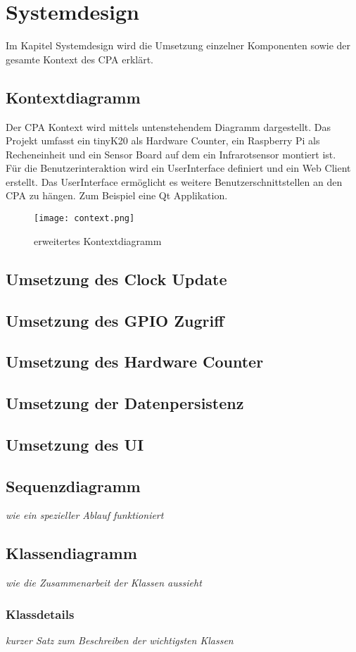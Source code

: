\section{Systemdesign}
    Im Kapitel Systemdesign wird die Umsetzung einzelner Komponenten sowie der gesamte Kontext des CPA erklärt.
        \subsection{Kontextdiagramm}
        Der CPA Kontext wird mittels untenstehendem Diagramm dargestellt. Das Projekt umfasst ein tinyK20 als Hardware Counter, ein Raspberry Pi als Recheneinheit und ein Sensor Board auf dem ein Infrarotsensor montiert ist.\\
        Für die Benutzerinteraktion wird ein UserInterface definiert und ein Web Client erstellt. Das UserInterface ermöglicht es weitere Benutzerschnittstellen an den CPA zu hängen. Zum Beispiel eine Qt Applikation.
        \begin{figure}[H]
            \centering
            \texttt{[image: context.png]}
            \caption{erweitertes Kontextdiagramm}
        \end{figure}

    	\subsection{Umsetzung des Clock Update}
		\subsection{Umsetzung des GPIO Zugriff}
		\subsection{Umsetzung des Hardware Counter}
        \subsection{Umsetzung der Datenpersistenz}
        \subsection{Umsetzung des UI}
		\subsection{Sequenzdiagramm}
			\textit{wie ein spezieller Ablauf funktioniert}
		\subsection{Klassendiagramm}
			\textit{wie die Zusammenarbeit der Klassen aussieht}
			\subsubsection{Klassdetails}
				\textit{kurzer Satz zum Beschreiben der wichtigsten Klassen}